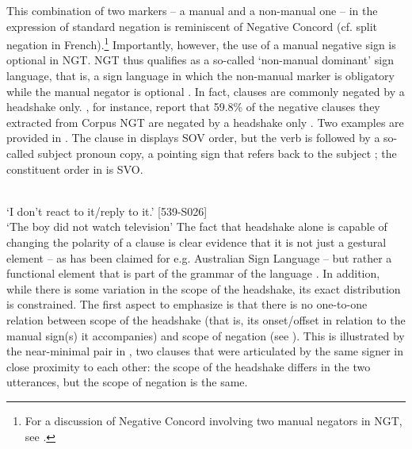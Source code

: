 \documentclass[output=paper,colorlinks,citecolor=brown]{langscibook}
\begin{document}
This combination of two markers -- a manual and a non-manual one -- in the expression of standard negation is reminiscent of Negative Concord (cf. split negation in French).\footnote{For a discussion of Negative Concord involving two manual negators in NGT, see \citealt{VanBovenEtAl2023}.} Importantly, however, the use of a manual negative sign is optional in NGT. NGT thus qualifies as a so-called `non-manual dominant' sign language, that is, a sign language in which the non-manual marker is obligatory while the manual negator is optional \citep{Zeshan2006}. In fact, clauses are commonly negated by a headshake only. \citet{OomenPfau2017}, for instance, report that 59.8\% of the negative clauses they extracted from Corpus NGT are negated by a headshake only \citep[also see][]{Coerts1992}. Two examples are provided in . The clause in  displays SOV order, but the verb is followed by a so-called subject pronoun copy, a pointing sign that refers back to the subject \citep[23]{OomenPfau2017}; the constituent order in  is SVO.  

\largerpage

\ea\label{ex:ngt:hs-only} 
    \ea\label{ex:ngt:hs-only1} 
      \\ `I don't react to it/reply to it.'  [539-S026]
    \ex\label{ex:ngt:hs-only2}  \\ `The boy did not watch television'  \citep[218]{Coerts1992}
    \z
\z 
The fact that headshake alone is capable of changing the polarity of a clause is clear evidence that it is not just a gestural element -- as has been claimed for e.g. Australian Sign Language \citep{Johnston2018} -- but rather a functional element that is part of the grammar of the language \citep{Pfau2015}. In addition, while there is some variation in the scope of the headshake, its exact distribution is constrained. The first aspect to emphasize is that there is no one-to-one relation between scope of the headshake (that is, its onset/offset in relation to the manual sign(s) it accompanies) and scope of negation (see ). This is illustrated by the near-minimal pair in , two clauses that were articulated by the same signer in close proximity to each other: the scope of the headshake differs in the two utterances, but the scope of negation is the same.
\end{document}
